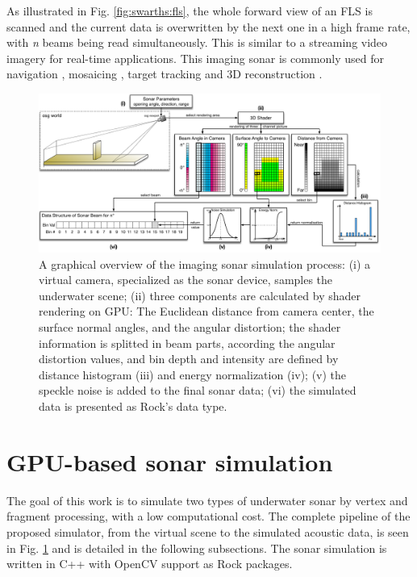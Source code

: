 \documentclass[final,5p,times]{elsarticle}
\begin{document}
As illustrated in Fig. \ref{fig:swarths:fls}, the whole forward view of an
FLS is scanned and the current data is overwritten by the next one in a high
frame rate, with \textit{n} beams being read simultaneously. This is similar
to a streaming video imagery for real-time applications. This imaging sonar
is commonly used for navigation \cite{fallon2013},
mosaicing \cite{hurtos2014}, target tracking \cite{liu2016}
and 3D reconstruction \cite{huang2015}.


\begin{figure}[t]
    \includegraphics[width=0.85\paperwidth]{figs/sonar_sim}
    \centering
    \captionsetup{justification=centering}
    \caption{A graphical overview of the imaging sonar simulation process:
    (i) a virtual camera, specialized as the sonar device, samples the
    underwater scene; (ii) three components are calculated by shader
    rendering on GPU: The Euclidean distance from camera center, the surface
    normal angles, and the angular distortion; the shader information is
    splitted in beam parts, according the angular distortion values, and
    bin depth and intensity are defined by distance histogram (iii) and energy
    normalization (iv); (v) the speckle noise is added to the final sonar data;
    (vi) the simulated data is presented as Rock's data type.}
    \label{fig:sonar_sim}
\end{figure}



\section{GPU-based sonar simulation}
\label{dev}

The goal of this work is to simulate two types of underwater sonar by vertex
and fragment processing, with a low computational cost. The complete pipeline
of the proposed simulator, from the virtual scene to the simulated acoustic data,
is seen in Fig. \ref{fig:sonar_sim} and is detailed in the following subsections.
The sonar simulation is written in C++ with OpenCV \cite{bradski2000} support as
Rock packages.
\end{document}
